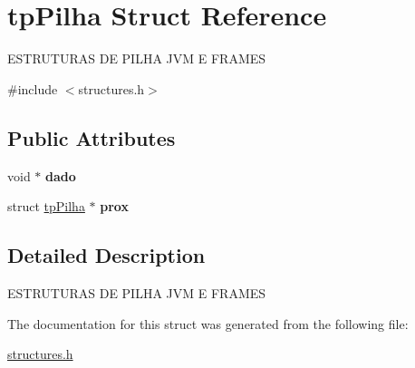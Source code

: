 \hypertarget{structtpPilha}{}\section{tp\+Pilha Struct Reference}
\label{structtpPilha}




 E\+S\+T\+R\+U\+T\+U\+R\+AS DE P\+I\+L\+HA J\+VM E F\+R\+A\+M\+ES  




{\ttfamily \#include $<$structures.\+h$>$}

\subsection*{Public Attributes}
\begin{DoxyCompactItemize}
\item 
\mbox{\label{structtpPilha_a4e7edc90c5ab17911dcee35ebb75d44e}} 
void $\ast$ {\bfseries dado}
\item 
\mbox{\label{structtpPilha_ab0bf456685a34722977d71c90c8ca96f}} 
struct \mbox{\hyperlink{structtpPilha}{tp\+Pilha}} $\ast$ {\bfseries prox}
\end{DoxyCompactItemize}


\subsection{Detailed Description}


 E\+S\+T\+R\+U\+T\+U\+R\+AS DE P\+I\+L\+HA J\+VM E F\+R\+A\+M\+ES 

The documentation for this struct was generated from the following file\+:\begin{DoxyCompactItemize}
\item 
\mbox{\hyperlink{structures_8h}{structures.\+h}}\end{DoxyCompactItemize}
